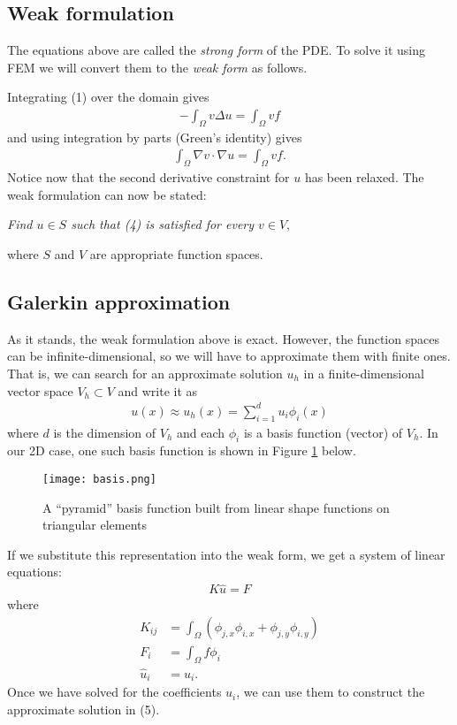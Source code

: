\documentclass[12pt,notitlepage]{extreport}
\begin{document}
\subsection*{Weak formulation}
The equations above are called the \textit{strong form} of the PDE. To solve it using FEM we will convert them to the \textit{weak form} as follows.

Integrating (1) over the domain gives
\begin{align}
  -\int_\Omega v \Delta u = \int_\Omega v f
\end{align}
and using integration by parts (Green's identity) gives
\begin{align}
  \int_\Omega \nabla v \cdot \nabla u = \int_\Omega v f.
\end{align}
Notice now that the second derivative constraint for $u$ has been relaxed. The weak formulation can now be stated:

\textit{Find $u \in S$ such that (4) is satisfied for every $v \in V$},

\noindent where $S$ and $V$ are appropriate function spaces.

\subsection*{Galerkin approximation}
As it stands, the weak formulation above is exact. However, the function spaces can be infinite-dimensional, so we will have to approximate them with finite ones. That is, we can search for an approximate solution $u_h$ in a finite-dimensional vector space $V_h \subset V$ and write it as
\begin{align}
  u(x) \approx u_h(x) = \sum_{i=1}^d u_i \phi_i(x)
\end{align}
where $d$ is the dimension of $V_h$ and each $\phi_i$ is a basis function (vector) of $V_h$. In our 2D case, one such basis function is shown in Figure \ref{fig:basis} below.
\begin{figure}[h]
  \centering
  \texttt{[image: basis.png]}

  \caption{A ``pyramid'' basis function built from linear shape functions on triangular elements}
  \label{fig:basis}
\end{figure}
If we substitute this representation into the weak form, we get a system of linear equations:
\begin{align}
  K\hat{u} = F
\end{align}
where
\begin{align}
  K_{ij} &= \int_\Omega (\phi_{j,x} \phi_{i,x} + \phi_{j,y} \phi_{i,y}) \\
  F_i &= \int_\Omega f \phi_i \\
  \hat{u}_i &= u_i.
\end{align}
Once we have solved for the coefficients $u_i$, we can use them to construct the approximate solution in (5).
\end{document}
